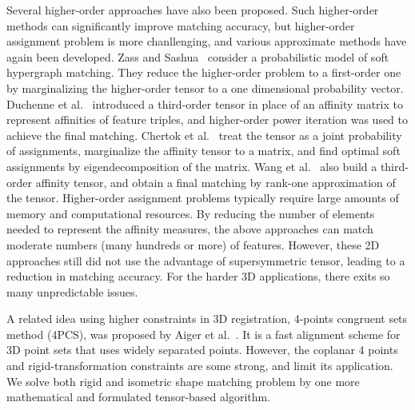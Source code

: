 Several higher-order approaches have also been proposed.
Such higher-order methods can significantly improve matching accuracy,
but higher-order assignment problem is more chanllenging, and various approximate methods have again been developed.
Zass and Sashua~\cite{Zass08} consider a probabilistic model of soft hypergraph matching.
They reduce the higher-order problem to a first-order one by marginalizing the higher-order tensor to a one dimensional probability vector.
Duchenne et al.~\cite{Duchenne09} introduced a third-order tensor in place of an affinity matrix to represent affinities of feature triples,
and higher-order power iteration was used to achieve the final matching.
Chertok et al.~\cite{Chertok10} treat the tensor as a joint probability of assignments, marginalize the affinity tensor to a matrix,
and find optimal soft assignments by eigendecomposition of the matrix.
Wang et al.~\cite{Aiping10} also build a third-order affinity tensor, and obtain a final matching by rank-one approximation of the tensor.
Higher-order assignment problems typically require large amounts of memory and computational resources.
By reducing the number of elements needed to represent the affinity measures,
the above approaches can match moderate numbers (many hundreds or more) of features.
However, these 2D approaches still did not use the advantage of supersymmetric tensor, leading to a reduction in matching accuracy.
For the harder 3D applications, there exits so many unpredictable issues.

A related idea using higher constraints in 3D registration, 4-points congruent sets method (4PCS), was proposed by Aiger et al.~\cite{Aiger08}.
It is a fast alignment scheme for 3D point sets that uses widely separated points.
However, the coplanar 4 points and rigid-transformation constraints are some strong, and limit its application.
We solve both rigid and isometric shape matching problem by one more mathematical and formulated tensor-based algorithm.
